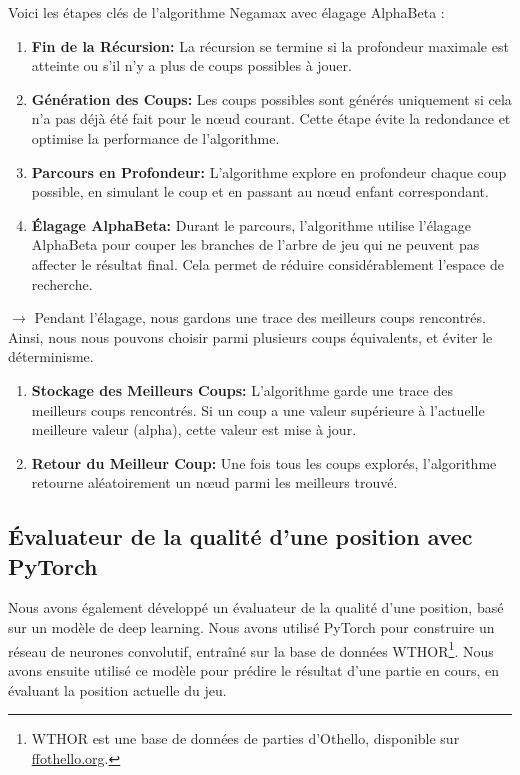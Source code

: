 Voici les étapes clés de l'algorithme Negamax avec élagage AlphaBeta :

\begin{enumerate}[label=\textbf{Étape \arabic*:}, wide, labelwidth=!, labelindent=0pt]
    \item \textbf{Fin de la Récursion:} La récursion se termine si la profondeur maximale est atteinte ou s'il n'y a plus de coups possibles à jouer.

    \item \textbf{Génération des Coups:} Les coups possibles sont générés uniquement si cela n'a pas déjà été fait pour le nœud courant. Cette étape évite la redondance et optimise la performance de l'algorithme.

    \item \textbf{Parcours en Profondeur:} L'algorithme explore en profondeur chaque coup possible, en simulant le coup et en passant au nœud enfant correspondant.

    \item \textbf{Élagage AlphaBeta:} Durant le parcours, l'algorithme utilise l'élagage AlphaBeta pour couper les branches de l'arbre de jeu qui ne peuvent pas affecter le résultat final. Cela permet de réduire considérablement l'espace de recherche.
\end{enumerate}
$\rightarrow$  Pendant l'élagage, nous gardons une trace des meilleurs coups rencontrés. Ainsi, nous nous pouvons choisir parmi plusieurs coups équivalents, et éviter le déterminisme.

\begin{enumerate}[resume, label=\textbf{Étape \arabic*:}, wide, labelwidth=!, labelindent=0pt]
    \item \textbf{Stockage des Meilleurs Coups:} L'algorithme garde une trace des meilleurs coups rencontrés. Si un coup a une valeur supérieure à l'actuelle meilleure valeur (alpha), cette valeur est mise à jour.

    \item \textbf{Retour du Meilleur Coup:} Une fois tous les coups explorés, l'algorithme retourne aléatoirement un nœud parmi les meilleurs trouvé.
\end{enumerate}


\subsection{Évaluateur de la qualité d'une position avec PyTorch}
\label{subsec:eval}
Nous avons également développé un évaluateur de la qualité d'une position, basé sur un modèle de deep learning. Nous avons utilisé PyTorch pour construire un réseau de neurones convolutif, entraîné sur la base de données WTHOR\footnote{WTHOR est une base de données de parties d'Othello, disponible sur \href{http://www.ffothello.org/informatique/la-base-wthor/}{ffothello.org}.}. Nous avons ensuite utilisé ce modèle pour prédire le résultat d'une partie en cours, en évaluant la position actuelle du jeu.

